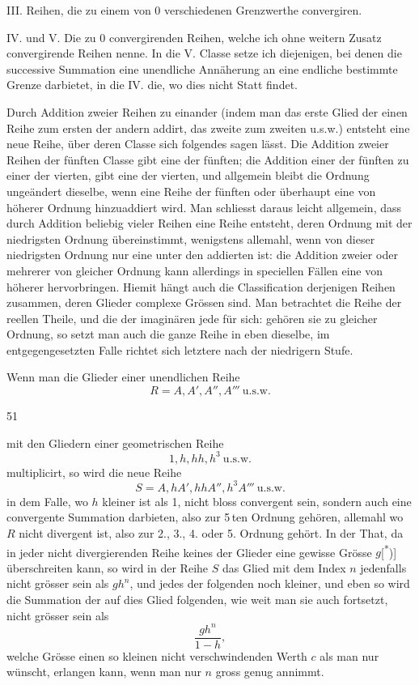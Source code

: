 III. Reihen, die zu einem von 0 verschiedenen Grenzwerthe convergiren.

IV. und V. Die zu 0 convergirenden Reihen, welche ich ohne weitern Zusatz convergirende Reihen nenne. In die V. Classe setze ich diejenigen, bei denen die successive Summation eine unendliche Annäherung an eine endliche bestimmte Grenze darbietet, in die IV. die, wo dies nicht Statt findet.

Durch Addition zweier Reihen zu einander (indem man das erste Glied der einen Reihe zum ersten der andern addirt, das zweite zum zweiten u.s.w.) entsteht eine neue Reihe, über deren Classe sich folgendes sagen lässt. Die Addition zweier Reihen der fünften Classe gibt eine der fünften; die Addition einer der fünften zu einer der vierten, gibt eine der vierten, und allgemein bleibt die Ordnung ungeändert dieselbe, wenn eine Reihe der fünften oder überhaupt eine von höherer Ordnung hinzuaddiert wird. Man schliesst daraus leicht allgemein, dass durch Addition beliebig vieler Reihen eine Reihe entsteht, deren Ordnung mit der niedrigsten Ordnung übereinstimmt, wenigstens allemahl, wenn von dieser niedrigsten Ordnung nur eine unter den addierten ist: die Addition zweier oder mehrerer von gleicher Ordnung kann allerdings in speciellen Fällen eine von höherer hervorbringen. Hiemit hängt auch die Classification derjenigen Reihen zusammen, deren Glieder complexe Grössen sind. Man betrachtet die Reihe der reellen Theile, und die der imaginären jede für sich: gehören sie zu gleicher Ordnung, so setzt man auch die ganze Reihe in eben dieselbe, im entgegengesetzten Falle richtet sich letztere nach der niedrigern Stufe.

Wenn man die Glieder einer unendlichen Reihe
\[
R=A,A',A'',A'''\ \text{u.s.w.}
\]
\par\vfill{}\hfill{\small 51}\par
\clearpage{}
\noindent mit den Gliedern einer geometrischen Reihe
\[
1,h,hh,h^3\ \text{u.s.w.}
\]
\noindent multiplicirt, so wird die neue Reihe
\[
S=A,hA',hhA'',h^3A'''\ \text{u.s.w.}
\]
\noindent in dem Falle, wo \(h\) kleiner ist als 1, nicht bloss convergent sein, sondern auch eine convergente Summation darbieten, also zur 5\,ten Ordnung gehören, allemahl wo \(R\) nicht divergent ist, also zur 2., 3., 4. oder 5. Ordnung gehört. In der That, da in jeder nicht divergierenden Reihe keines der Glieder eine gewisse Grösse \(g\)[\textsuperscript{*})] überschreiten kann, so wird in der Reihe \(S\) das Glied mit dem Index \(n\) jedenfalls nicht grösser sein als \(gh^n\), und jedes der folgenden noch kleiner, und eben so wird die Summation der auf dies Glied folgenden, wie weit man sie auch fortsetzt, nicht grösser sein als
\[
\frac{gh^n}{1-h},
\]
\noindent welche Grösse einen so kleinen nicht verschwindenden Werth \(c\) als man nur wünscht, erlangen kann, wenn man nur \(n\) gross genug annimmt.


